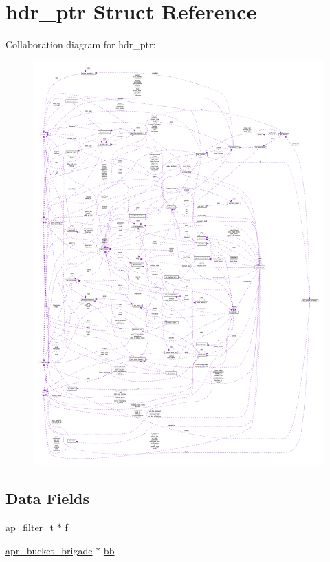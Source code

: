 \hypertarget{structhdr__ptr}{}\section{hdr\+\_\+ptr Struct Reference}
\label{structhdr__ptr}


Collaboration diagram for hdr\+\_\+ptr\+:
\nopagebreak
\begin{figure}[H]
\begin{center}
\leavevmode
\includegraphics[width=350pt]{structhdr__ptr__coll__graph}
\end{center}
\end{figure}
\subsection*{Data Fields}
\begin{DoxyCompactItemize}
\item 
\hyperlink{structap__filter__t}{ap\+\_\+filter\+\_\+t} $\ast$ \hyperlink{structhdr__ptr_aa0aa52ee9894e6caffcc265edf225878}{f}
\item 
\hyperlink{structapr__bucket__brigade}{apr\+\_\+bucket\+\_\+brigade} $\ast$ \hyperlink{structhdr__ptr_a92d1c8778907c80a8041d320cc568fb3}{bb}
\end{DoxyCompactItemize}


